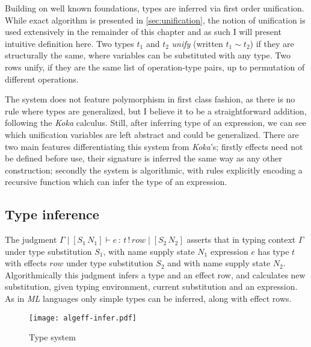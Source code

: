 \documentclass[inz, english, shortabstract]{iithesis}
\begin{document}
Building on well known foundations\cite{Pierce2002}, types are inferred via first order unification.
While exact algorithm is presented in \autoref{sec:unification}, the notion of unification is used extensively in the remainder of this chapter and as such I will present intuitive definition here.
Two types $t_1$ and $t_2$ \emph{unify} (written $t_1 \sim t_2$) if they are structurally the same, where variables can be substituted with any type.
Two rows unify, if they are the same list of operation-type pairs, up to permutation of different operations.

The system does not feature polymorphism in first class fashion, as there is no rule where types are generalized, but I believe it to be a straightforward addition, following the \emph{Koka}\cite{Leijen2014} calculus.
Still, after inferring type of an expression, we can see which unification variables are left abstract and could be generalized.
There are two main features differentiating this system from \emph{Koka}'s; firstly effects need not be defined before use, their signature is inferred the same way as any other construction; secondly the system is algorithmic, with rules explicitly encoding a recursive function which can infer the type of an expression.

\subsection{Type inference}
The judgment $ \Gamma \mid [S_1 \, N_1] \vdash e \, : \, t \, ! \, row \mid [S_2 \, N_2] $ asserts that in typing context $ \Gamma $ under type substitution $ S_1 $, with name supply state $ N_1 $ expression $ e $ has type $ t $ with effects $ row $ under type substitution $ S_2 $ and with name supply state $ N_2 $.
Algorithmically this judgment infers a type and an effect row, and calculates new substitution, given typing environment, current substitution and an expression.
As in \emph{ML} languages only simple types can be inferred, along with effect rows.

\begin{figure}
  \centering
  \texttt{[image: algeff-infer.pdf]}
  \caption{Type system} 
  \label{fig:algeff-infer} 
\end{figure}
\end{document}
